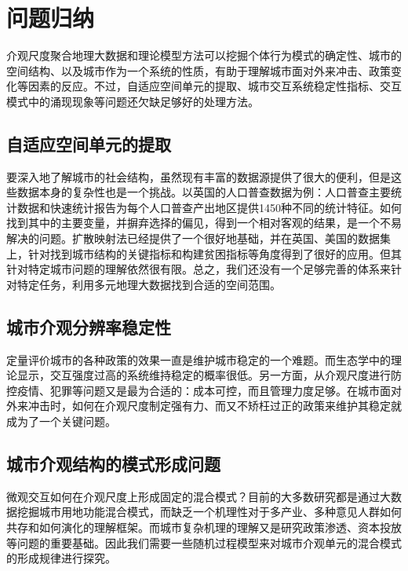 \section{问题归纳}

介观尺度聚合地理大数据和理论模型方法可以挖掘个体行为模式的确定性、城市的空间结构、以及城市作为一个系统的性质，有助于理解城市面对外来冲击、政策变化等因素的反应。不过，自适应空间单元的提取、城市交互系统稳定性指标、交互模式中的涌现现象等问题还欠缺足够好的处理方法。

\subsection{自适应空间单元的提取}

要深入地了解城市的社会结构，虽然现有丰富的数据源提供了很大的便利，但是这些数据本身的复杂性也是一个挑战。以英国的人口普查数据为例：人口普查主要统计数据和快速统计报告为每个人口普查产出地区提供1450种不同的统计特征。如何找到其中的主要变量，并摒弃选择的偏见，得到一个相对客观的结果，是一个不易解决的问题。扩散映射法已经提供了一个很好地基础，并在英国、美国的数据集上，针对找到城市结构的关键指标\cite{barter2019manifold}和构建贫困指标\cite{ghafourian2020mathematical}等角度得到了很好的应用。但其针对特定城市问题的理解依然很有限。总之，我们还没有一个足够完善的体系来针对特定任务，利用多元地理大数据找到合适的空间范围。

\subsection{城市介观分辨率稳定性}

定量评价城市的各种政策的效果一直是维护城市稳定的一个难题。而生态学中的理论显示\cite{may1972will}，交互强度过高的系统维持稳定的概率很低。另一方面，从介观尺度进行防控疫情、犯罪等问题又是最为合适的：成本可控，而且管理力度足够。在城市面对外来冲击时，如何在介观尺度制定强有力、而又不矫枉过正的政策来维护其稳定就成为了一个关键问题。

\subsection{城市介观结构的模式形成问题}

微观交互如何在介观尺度上形成固定的混合模式？目前的大多数研究都是通过大数据挖掘城市用地功能混合模式，而缺乏一个机理性对于多产业、多种意见人群如何共存和如何演化的理解框架。而城市复杂机理的理解又是研究政策渗透、资本投放等问题的重要基础。因此我们需要一些随机过程模型来对城市介观单元的混合模式的形成规律进行探究。